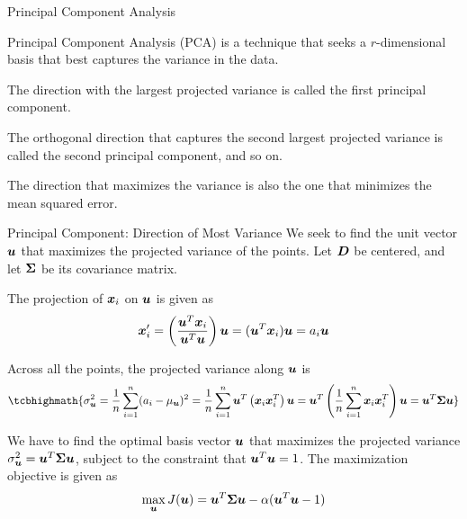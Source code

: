 \begin{frame}{Principal Component Analysis}

Principal Component Analysis (PCA) is a technique that
seeks a $r$-dimensional basis that best captures the
variance in the data.

\medskip
The direction with the largest projected variance is called
the f\/{i}rst principal component.

\medskip
The orthogonal direction that captures
the second largest projected variance is called the second principal component,
and so on. 

\medskip
The direction that maximizes the
variance is also the one that minimizes the mean squared
error.
\end{frame}





\begin{frame}{Principal Component: Direction of Most Variance}
We seek to find the unit vector ${\boldsymbol u}$ that maximizes the projected
variance of the points. Let ${\boldsymbol D}$ be centered, and let ${\bm \Sigma}$ be its
covariance matrix.

\medskip
The projection of ${\boldsymbol x}_i$ on ${\boldsymbol u}$ is given as
\begin{align*}
  {\boldsymbol x}_i' =
  \left(\frac{{\boldsymbol u}^T {\boldsymbol x}_i}{{\boldsymbol u}^T{\boldsymbol u}}\right) {\boldsymbol u} = ({\boldsymbol u}^T {\boldsymbol x}_i) {\boldsymbol u} =
  a_i {\boldsymbol u}
\end{align*}

\medskip
Across all the points, the 
projected variance along ${\boldsymbol u}$ is
\begin{align*}
\tcbhighmath{
  \sigma^2_\bu  
  = \frac{1}{n}\sum_{i=1}^n (a_i-\mu_\bu)^2 
  = \frac{1}{n} \sum_{i=1}^n \bu^T \lB(\bx_{i}\bx_i^T\rB) \bu
   =  \bu^T \lB(\frac{1}{n}\sum_{i=1}^n \bx_i\bx_i^T\rB) \bu
  =  \bu^T \cov \bu
}
\end{align*}


\medskip
We have to find the
optimal basis vector ${\boldsymbol u}$ that maximizes the projected variance 
$\sigma^2_{\boldsymbol u} = {\boldsymbol u}^T {\bm \Sigma} {\boldsymbol u}$, subject to the 
constraint that ${\boldsymbol u}^T{\boldsymbol u}=1$. The maximization objective is given as
\begin{align*}
  \max_{\boldsymbol u} J({\boldsymbol u}) = 
  {\boldsymbol u}^T {\bm \Sigma} {\boldsymbol u} - \alpha ({\boldsymbol u}^T{\boldsymbol u}-1)
\end{align*}

\end{frame}


